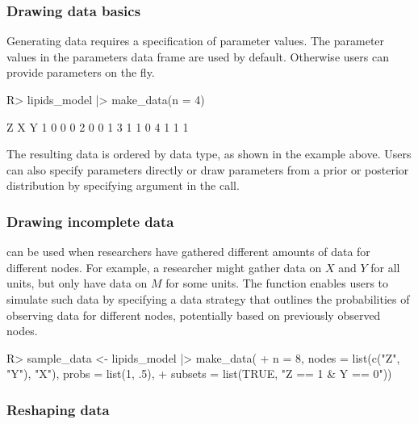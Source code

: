 \documentclass[
  11pt,
  article]{jss}
\renewcommand{\texttt}[1]{\code{#1}}
\begin{document}
\subsubsection{Drawing data basics}\label{drawing-data-basics}

Generating data requires a specification of parameter values. The
parameter values in the parameters data frame are used by default.
Otherwise users can provide parameters on the fly.

\begin{CodeChunk}
\begin{CodeInput}
R> lipids_model |> make_data(n = 4)
\end{CodeInput}

\begin{CodeOutput}
  Z X Y
1 0 0 0
2 0 0 1
3 1 1 0
4 1 1 1
\end{CodeOutput}
\end{CodeChunk}

The resulting data is ordered by data type, as shown in the example
above. Users can also specify parameters directly or draw parameters
from a prior or posterior distribution by specifying
\texttt{param\_type} argument in the \texttt{make\_data()} call.

\subsubsection{Drawing incomplete data}\label{drawing-incomplete-data}

 can be used when researchers have gathered different
amounts of data for different nodes. For example, a researcher might
gather data on \(X\) and \(Y\) for all units, but only have data on
\(M\) for some units. The \texttt{make\_data()} function enables users
to simulate such data by specifying a data strategy that outlines the
probabilities of observing data for different nodes, potentially based
on previously observed nodes.

\begin{CodeInput}
R> sample_data <- lipids_model |> make_data(
+    n = 8, nodes = list(c("Z", "Y"), "X"), probs = list(1, .5),
+    subsets = list(TRUE, "Z == 1 & Y == 0"))
\end{CodeInput}

\subsubsection{Reshaping data}\label{reshaping-data}
\end{document}
